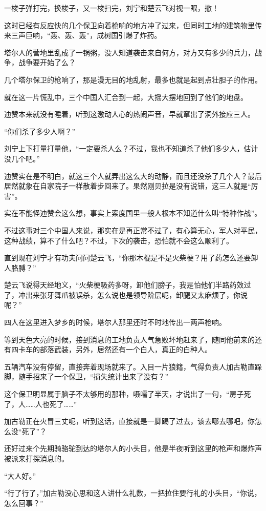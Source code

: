 一梭子弹打完，换梭子，又一梭扫完，刘宁和楚云飞对视一眼，撤！

这时已经有反应快的几个保卫向着枪响的地方冲了过来，但同时工地的建筑物里传来三声巨响，“轰、轰、轰”，成树国引爆了炸药。

塔尔人的营地里乱成了一锅粥，没人知道袭击来自何方，对方又有多少的兵力，战争，战争要开始了么？

几个塔尔保卫的枪响了，那是漫无目的地乱射，最多也就是起到点壮胆子的作用。

就在这一片慌乱中，三个中国人汇合到一起，大摇大摆地回到了他们的地盘。

迪赞本来就没有睡着，听到这激动人心的热闹声音，早就窜出了洞外接应三人。

“你们杀了多少人啊？”

刘宁上下打量打量他，“一定要杀人么？不过，我也不知道杀了他们多少人，估计没几个吧。”

迪赞实在是不明白，就这三个人就弄出这么大的动静，而且还没杀了几个人？最后居然就象在自家院子一样散着步回来了。果然刚贝拉是没有说错，这三人就是“厉害”。

实在不能怪迪赞会这么想，事实上索度国里一般人根本不知道什么叫“特种作战”。

不过这事对三个中国人来说，那实在是再正常不过了，有心算无心，军人对平民，这种战绩，算不了什么吧？不过，下次的袭击，恐怕就不会这么顺利了。

直到现在刘宁才有功夫问问楚云飞，“你那木棍是不是火柴梗？用了药怎么还要卸人胳膊？”

楚云飞说得天经地义，“火柴梗吸药多呀，卸他们膀子，我是怕他们半路药效过了，冲出来张牙舞爪被误杀，怎么说也是领导阶层呢，卸腿又太麻烦了，你说呢？”

四人在这里进入梦乡的时候，塔尔人那里还时不时地传出一两声枪响。

等到天色大亮的时候，接到消息的工地负责人气急败坏地赶来了，随同他前来的还有四卡车的部落武装，另外，居然还有一个白人，真正的白种人。

五辆汽车没有停留，直接奔着现场就来了。入目一片狼籍，气得负责人加古勒直跺脚，随手招来了一个保卫，“损失统计出来了没有？”

这个保卫明显属于脑子不太够用的那种，嗫嚅了半天，才说出了一句，“房子死了，人……人也死了……”

加古勒正在火冒三丈呢，听到这话，直接就是一脚踢了过去，该去哪去哪吧，你怎么没“死了”？

还好过来个先期骑骆驼到达的塔尔人的小头目，他是半夜听到这里的枪声和爆炸声被派来打探消息的。

“大人好。”

“行了行了，”加古勒没心思和这人讲什么礼数，一把拉住要行礼的小头目，“你说，怎么回事？”

